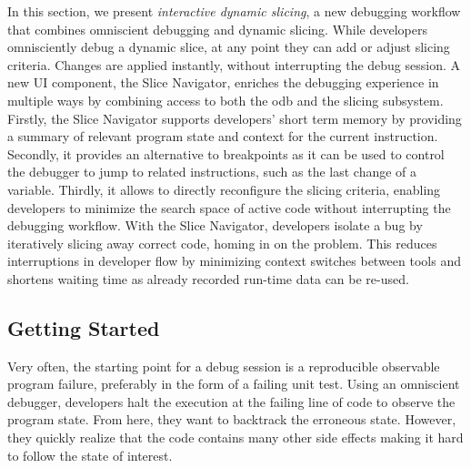 In this section, we present \emph{interactive dynamic slicing}, a new debugging workflow that combines omniscient debugging and dynamic slicing. 
While developers omnisciently debug a dynamic slice, at any point they can add or adjust slicing criteria. 
Changes are applied instantly, without interrupting the debug session. 
A new UI component, the Slice Navigator, enriches the debugging experience in multiple ways by combining access to both the \ac{odb} and the slicing subsystem.
Firstly, the Slice Navigator supports developers’ short term memory
by providing a summary of relevant program state and context for the current
instruction. Secondly, it provides an alternative to breakpoints as it can be used
to control the debugger to jump to related instructions, such as the last change of
a variable. Thirdly, it allows to directly reconfigure the slicing criteria, enabling
developers to minimize the search space of active code without interrupting the
debugging workflow.
With the Slice Navigator, developers isolate a bug by iteratively slicing away correct code, homing in on the problem. 
This reduces interruptions in developer flow by minimizing context switches between tools and shortens waiting time as already recorded run-time data can be re-used.

\tmpEnd
\tmpStart

\subsection{Getting Started}
\label{sec:example}

Very often, the starting point for a debug session is a reproducible observable program failure, preferably in the form of a failing unit test.
Using an omniscient debugger, developers halt the execution at the failing line of code to observe the program state.
From here, they want to backtrack the erroneous state.
However, they quickly realize that the code contains many other side effects making it hard to follow the state of interest.

